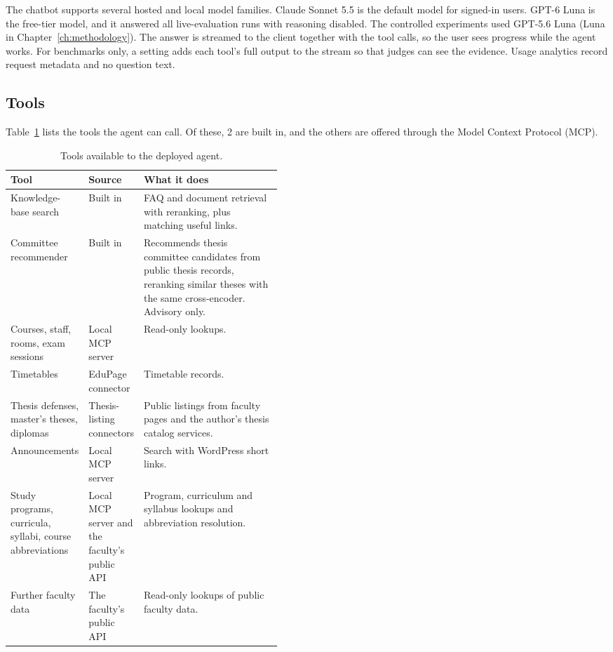 The chatbot supports several hosted and local model families. Claude Sonnet 5.5 is the default model for signed-in users. GPT-6 Luna is the free-tier model, and it answered all live-evaluation runs with reasoning disabled. The controlled experiments used GPT-5.6 Luna (Luna in Chapter~\ref{ch:methodology}). The answer is streamed to the client together with the tool calls, so the user sees progress while the agent works. For benchmarks only, a setting adds each tool's full output to the stream so that judges can see the evidence. Usage analytics record request metadata and no question text.

\subsection{Tools}

Table~\ref{tab:agent-tools} lists the tools the agent can call. Of these, 2 are built in, and the others are offered through the Model Context Protocol (MCP).

\begin{table}[htbp]
\centering
\caption{Tools available to the deployed agent.}
\label{tab:agent-tools}
\small
\begin{tabularx}{\linewidth}{@{}>{\raggedright\arraybackslash}p{0.25\linewidth}>{\raggedright\arraybackslash}p{0.2\linewidth}X@{}}
\toprule
Tool & Source & What it does \\
\midrule
Knowledge-base search & Built in & FAQ and document retrieval with reranking, plus matching useful links. \\
Committee recommender & Built in & Recommends thesis committee candidates from public thesis records, reranking similar theses with the same cross-encoder. Advisory only. \\
Courses, staff, rooms, exam sessions & Local MCP server & Read-only lookups. \\
Timetables & EduPage connector & Timetable records. \\
Thesis defenses, master's theses, diplomas & Thesis-listing connectors & Public listings from faculty pages and the author's thesis catalog services. \\
Announcements & Local MCP server & Search with WordPress short links. \\
Study programs, curricula, syllabi, course abbreviations & Local MCP server and the faculty's public API & Program, curriculum and syllabus lookups and abbreviation resolution. \\
Further faculty data & The faculty's public API & Read-only lookups of public faculty data. \\
\bottomrule
\end{tabularx}
\end{table}

